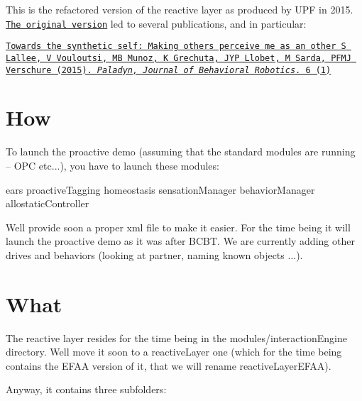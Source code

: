 This is the refactored version of the reactive layer as produced by U\+PF in 2015. \href{https://github.com/robotology/wysiwyd/tree/master/main/src/modules/reactiveLayerEFAA}{\tt The original version} led to several publications, and in particular\+:

\href{http://www.degruyter.com/view/j/pjbr.2015.6.issue-1/pjbr-2015-0010/pjbr-2015-0010.xml}{\tt Towards the synthetic self\+: Making others perceive me as an other S Lallee, V Vouloutsi, MB Munoz, K Grechuta, J\+YP Llobet, M Sarda, P\+F\+MJ Verschure (2015). {\itshape Paladyn, Journal of Behavioral Robotics}. 6 (1)}

\section*{How}

To launch the proactive demo (assuming that the standard modules are running -- O\+PC etc...), you have to launch these modules\+: \begin{DoxyVerb}ears
proactiveTagging
homeostasis
sensationManager
behaviorManager
allostaticController
\end{DoxyVerb}


We\textquotesingle{}ll provide soon a proper xml file to make it easier. For the time being it will launch the proactive demo as it was after B\+C\+BT. We are currently adding other drives and behaviors (looking at partner, naming known objects ...).

\section*{What}

The reactive layer resides for the time being in the {\ttfamily modules/interaction\+Engine} directory. We\textquotesingle{}ll move it soon to a {\ttfamily reactive\+Layer} one (which for the time being contains the E\+F\+AA version of it, that we will rename {\ttfamily reactive\+Layer\+E\+F\+AA}).

Anyway, it contains three subfolders\+:


